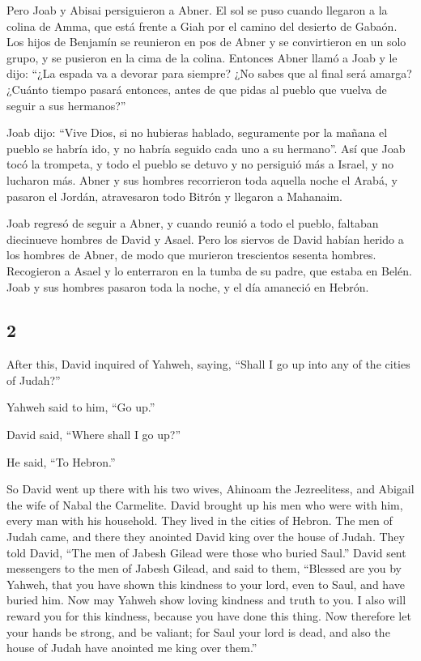 \begin{paracol}{2}
 Pero Joab y Abisai persiguieron a Abner. El sol se puso
cuando llegaron a la colina de Amma, que está frente a Giah por el
camino del desierto de Gabaón.  Los hijos de Benjamín se
reunieron en pos de Abner y se convirtieron en un solo grupo, y se
pusieron en la cima de la colina.  Entonces Abner llamó a
Joab y le dijo: ``¿La espada va a devorar para siempre? ¿No sabes que al
final será amarga? ¿Cuánto tiempo pasará entonces, antes de que pidas al
pueblo que vuelva de seguir a sus hermanos?''

 Joab dijo: ``Vive Dios, si no hubieras hablado,
seguramente por la mañana el pueblo se habría ido, y no habría seguido
cada uno a su hermano''.  Así que Joab tocó la trompeta,
y todo el pueblo se detuvo y no persiguió más a Israel, y no lucharon
más.  Abner y sus hombres recorrieron toda aquella noche
el Arabá, y pasaron el Jordán, atravesaron todo Bitrón y llegaron a
Mahanaim.

 Joab regresó de seguir a Abner, y cuando reunió a todo
el pueblo, faltaban diecinueve hombres de David y Asael. 
Pero los siervos de David habían herido a los hombres de Abner, de modo
que murieron trescientos sesenta hombres.  Recogieron a
Asael y lo enterraron en la tumba de su padre, que estaba en Belén. Joab
y sus hombres pasaron toda la noche, y el día amaneció en Hebrón.

\switchcolumn
\begin{otherlanguage}{english}

\hypertarget{section-3}{%
\section{2}\label{section-3}}

 After this, David inquired of Yahweh, saying, ``Shall I
go up into any of the cities of Judah?''

Yahweh said to him, ``Go up.''

David said, ``Where shall I go up?''

He said, ``To Hebron.''

 So David went up there with his two wives, Ahinoam the
Jezreelitess, and Abigail the wife of Nabal the Carmelite.
 David brought up his men who were with him, every man
with his household. They lived in the cities of Hebron. 
The men of Judah came, and there they anointed David king over the house
of Judah. They told David, ``The men of Jabesh Gilead were those who
buried Saul.''  David sent messengers to the men of Jabesh
Gilead, and said to them, ``Blessed are you by Yahweh, that you have
shown this kindness to your lord, even to Saul, and have buried him.
 Now may Yahweh show loving kindness and truth to you. I
also will reward you for this kindness, because you have done this
thing.  Now therefore let your hands be strong, and be
valiant; for Saul your lord is dead, and also the house of Judah have
anointed me king over them.''


\end{otherlanguage}
\end{paracol}
